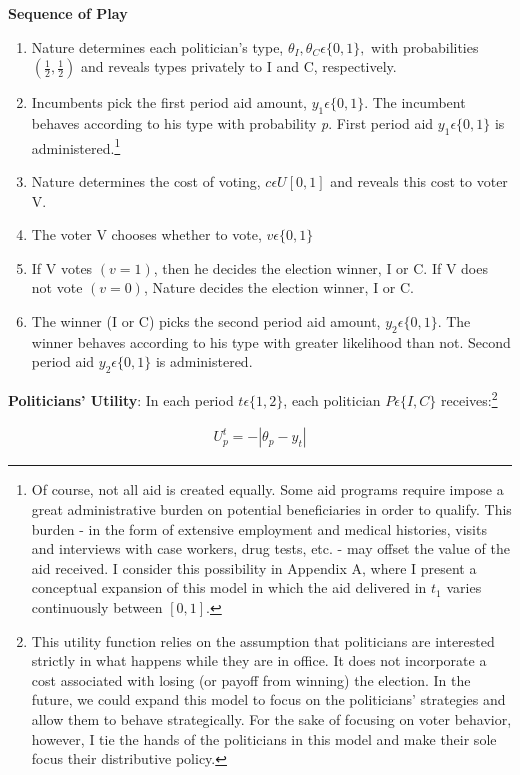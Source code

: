 \documentclass[12pt]{paper}
\begin{document}
\textbf{Sequence of Play}
\begin{enumerate}
	\item Nature determines each politician’s type, $\theta_I, \theta_C \epsilon \{0,1\},$ with probabilities $(\frac{1}{2}, \frac{1}{2})$ and reveals types privately to I and C, respectively.
	\item Incumbents pick the first period aid amount, $y_1\epsilon \{0,1\}.$ The incumbent behaves according to his type with probability \textit{p}. First period aid $y_1\epsilon \{0,1\}$ is administered.\footnote{Of course, not all aid is created equally. Some aid programs require impose a great administrative burden on potential beneficiaries in order to qualify. This burden - in the form of extensive employment and medical histories, visits and interviews with case workers, drug tests, etc. - may offset the value of the aid received. I consider this possibility in Appendix A, where I present a conceptual expansion of this model in which the aid delivered in $t_1$ varies continuously between $[0,1]$.}
	\item Nature determines the cost of voting, $c \epsilon U[0,1]$ and reveals this cost to voter V.
	\item The voter V chooses whether to vote, $v \epsilon \{0,1\}$
	\item If V votes $(v=1)$, then he decides the election winner, I or C. If V does not vote $(v=0)$, Nature decides the election winner, I or C.
	\item The winner (I or C) picks the second period aid amount, $y_2 \epsilon \{0,1\}$. The winner behaves according to his type with greater likelihood than not. Second period aid  $y_2 \epsilon \{0,1\}$ is administered.
\end{enumerate}

\textbf{Politicians' Utility}: In each period $t \epsilon \{1,2\}$, each politician $P \epsilon \{I,C\}$ receives:\footnote{This utility function relies on the assumption that politicians are interested strictly in what happens while they are in office. It does not incorporate a cost associated with losing (or payoff from winning) the election. In the future, we could expand this model to focus on the politicians' strategies and allow them to behave strategically. For the sake of focusing on voter behavior, however, I tie the hands of the politicians in this model and make their sole focus their distributive policy.} 

\begin{gather}
U_{p}^t = -|\theta_p - y_t|
\end{gather}
\end{document}
